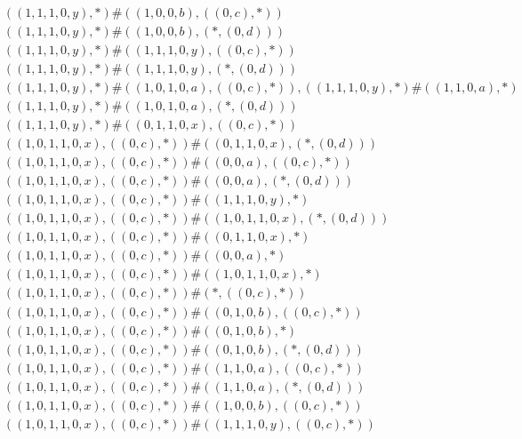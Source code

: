 \begin{align*}
	 & \qquad ((1, 1, 1, 0, y), *) \# ((1, 0, 0, b), ((0, c), *)) \\ 
	 & \qquad ((1, 1, 1, 0, y), *) \# ((1, 0, 0, b), (*, (0, d))) \\ 
	 & \qquad ((1, 1, 1, 0, y), *) \# ((1, 1, 1, 0, y), ((0, c), *)) \\ 
	 & \qquad ((1, 1, 1, 0, y), *) \# ((1, 1, 1, 0, y), (*, (0, d))) \\ 
	 & \qquad ((1, 1, 1, 0, y), *) \# ((1, 0, 1, 0, a), ((0, c), *)), ((1, 1, 1, 0, y), *) \# ((1, 1, 0, a), *) \\ 
	 & \qquad ((1, 1, 1, 0, y), *) \# ((1, 0, 1, 0, a), (*, (0, d))) \\ 
	 & \qquad ((1, 1, 1, 0, y), *) \# ((0, 1, 1, 0, x), ((0, c), *)) \\ 
	 & \qquad ((1, 0, 1, 1, 0, x), ((0, c), *)) \# ((0, 1, 1, 0, x), (*, (0, d))) \\ 
	 & \qquad ((1, 0, 1, 1, 0, x), ((0, c), *)) \# ((0, 0, a), ((0, c), *)) \\ 
	 & \qquad ((1, 0, 1, 1, 0, x), ((0, c), *)) \# ((0, 0, a), (*, (0, d))) \\ 
	 & \qquad ((1, 0, 1, 1, 0, x), ((0, c), *)) \# ((1, 1, 1, 0, y), *) \\ 
	 & \qquad ((1, 0, 1, 1, 0, x), ((0, c), *)) \# ((1, 0, 1, 1, 0, x), (*, (0, d))) \\ 
	 & \qquad ((1, 0, 1, 1, 0, x), ((0, c), *)) \# ((0, 1, 1, 0, x), *) \\ 
	 & \qquad ((1, 0, 1, 1, 0, x), ((0, c), *)) \# ((0, 0, a), *) \\ 
	 & \qquad ((1, 0, 1, 1, 0, x), ((0, c), *)) \# ((1, 0, 1, 1, 0, x), *) \\ 
	 & \qquad ((1, 0, 1, 1, 0, x), ((0, c), *)) \# (*, ((0, c), *)) \\ 
	 & \qquad ((1, 0, 1, 1, 0, x), ((0, c), *)) \# ((0, 1, 0, b), ((0, c), *)) \\ 
	 & \qquad ((1, 0, 1, 1, 0, x), ((0, c), *)) \# ((0, 1, 0, b), *) \\ 
	 & \qquad ((1, 0, 1, 1, 0, x), ((0, c), *)) \# ((0, 1, 0, b), (*, (0, d))) \\ 
	 & \qquad ((1, 0, 1, 1, 0, x), ((0, c), *)) \# ((1, 1, 0, a), ((0, c), *)) \\ 
	 & \qquad ((1, 0, 1, 1, 0, x), ((0, c), *)) \# ((1, 1, 0, a), (*, (0, d))) \\ 
	 & \qquad ((1, 0, 1, 1, 0, x), ((0, c), *)) \# ((1, 0, 0, b), ((0, c), *)) \\ 
	 & \qquad ((1, 0, 1, 1, 0, x), ((0, c), *)) \# ((1, 1, 1, 0, y), ((0, c), *)) \\ 

\end{align*}
